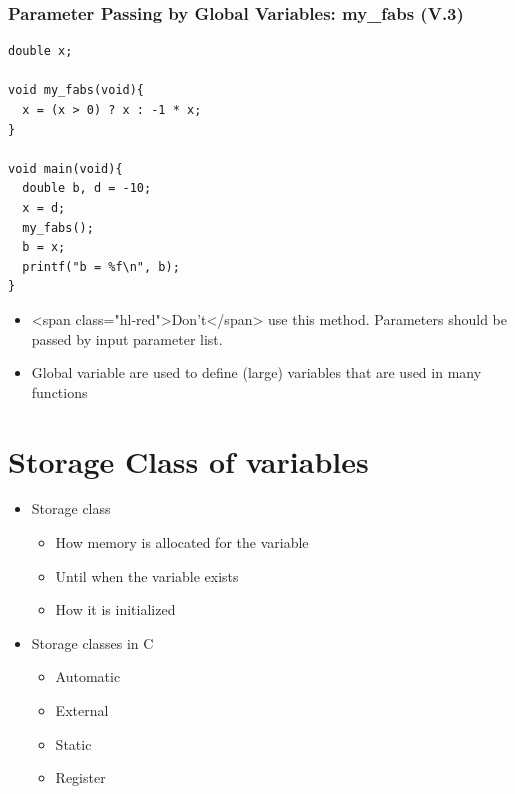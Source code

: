 \documentclass{../c-lecture}
\begin{document}
\begin{frame}[fragile]
  \frametitle{Parameter Passing by Global Variables: my_fabs (V.3)}
  \begin{verbatim}
double x;

void my_fabs(void){
  x = (x > 0) ? x : -1 * x;
}

void main(void){
  double b, d = -10;
  x = d;
  my_fabs();
  b = x;
  printf("b = %f\n", b);
}
  \end{verbatim}
\end{frame}
\begin{frame}
  \begin{itemize}
    \item
      <span class="hl-red">Don’t</span> use this method. Parameters should be
      passed by input parameter list.

    \item
      Global variable are used to define (large) variables that are used in
      many functions

  \end{itemize}
\end{frame}

\section{Storage Class of variables}

\begin{frame}
  \begin{itemize}
    \item Storage class
    \begin{itemize}
      \item How memory is allocated for the variable
      \item Until when the variable exists
      \item How it is initialized
    \end{itemize}
    \item Storage classes in C
    \begin{itemize}
      \item Automatic
      \item External
      \item Static
      \item Register
    \end{itemize}
  \end{itemize}
\end{frame}
\end{document}
